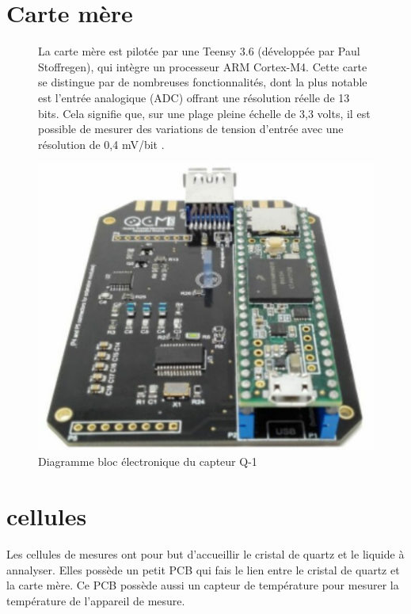 \section{Carte mère}
\begin{figure}[H]
    \centering
    \begin{minipage}{0.48\textwidth}
        \small
        La carte mère est pilotée par une Teensy 3.6 (développée par Paul Stoffregen), 
        qui intègre un processeur ARM Cortex-M4. Cette carte se distingue par de nombreuses fonctionnalités, 
        dont la plus notable est l'entrée analogique (ADC) offrant une résolution réelle de 13 bits. 
        Cela signifie que, sur une plage pleine échelle de 3,3 volts, il est possible de mesurer des variations de tension d’entrée avec une résolution de 0,4 mV/bit \cite{manual-openqcmQ1}.
    \end{minipage}\hfill
    \begin{minipage}{0.48\textwidth}
        \centering
        \includegraphics[width=\textwidth]{assets/figures/Quartz-Crystal-Microbalance-openQCM-Q-1-Shield-Photo.png}
        \caption{Diagramme bloc électronique du capteur Q-1 \cite{manual-openqcmQ1}}
        \label{fig:Main Board Q-1}
    \end{minipage}
\end{figure}

\section{cellules}
Les cellules de mesures ont pour but d'accueillir le cristal de quartz et le liquide à annalyser.
Elles possède un petit PCB qui fais le lien entre le cristal de quartz et la carte mère.
Ce PCB possède aussi un capteur de température pour mesurer la température de l'appareil de mesure.

